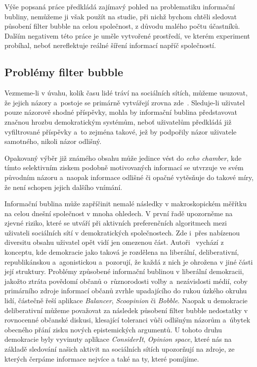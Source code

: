 \documentclass[12pt, a4paper]{article}
\numberwithin{equation}{section} 	%
\begin{document}
Výše popsaná práce předkládá zajímavý pohled na problematiku informační bubliny, nemůžeme ji však použít na studie, při nichž bychom chtěli sledovat působení filter bubble na celou společnost, z důvodu malého počtu účastníků. Dalším negativem této práce je uměle vytvořené prostředí, ve kterém experiment probíhal, neboť nereflektuje reálné šíření informací napříč společností.

\subsection{Problémy filter bubble}
Vezmeme-li v úvahu, kolik času lidé tráví na sociálních sítích, můžeme usuzovat, že jejich názory a~postoje se primárně vytvářejí zrovna zde~\cite{TheImpactOfFilterBubble, BeyondFilterBubble, whyNewsOnTwitter}. Sleduje-li uživatel pouze názorově shodné příspěvky, mohla by informační bublina před\-sta\-vo\-vat značnou hrozbu demokratickým systémům, neboť uživatelům předkládá již vyfiltrované příspěvky a~to zejména takové, jež by podpořily názor uživatele samotného, nikoli názor odlišný.

Opakovaný výběr již známého obsahu může jedince vést do \textit{echo chamber}, kde tímto selektivním ziskem podobně motivovaných informací se utvrzuje ve svém původním názoru a~naopak informace odlišné či opačné vytěsňuje do takové míry, že není schopen jejich dalšího vnímání.

Informační bublina může zapříčinit nemalé následky v makroskopickém mě\-ří\-tku na celou dnešní společnost v mnoha ohledech. V první řadě upozorněme na zjevné riziko, které se utváří při aktivních preferenčních algoritmech mezi uživateli sociálních sítí v demokratických společnostech. Zde i~přes nabízenou diversitu obsahu uživatel opět vidí jen omezenou část. Autoři~\cite{BreakingTheFilterBubble} vychází z konceptu, kde demokracie jako taková je rozdělena na liberální, deliberativní, republikánskou a~agonistickou a~pozorují, že každá z nich je ohrožena v jiné části její struktury. Problémy způsobené informační bublinou v liberální demokracii, jakožto ztráta povědomí občanů o~různorodosti volby a~nezávislosti médií, coby primárního zdroje informací občanů zvrhle upadajícího do rukou úzkého okruhu lidí, částečně řeší aplikace \textit{Balancer}, \textit{Scoopinion} či \textit{Bobble}.
Naopak u demokracie deliberativní můžeme považovat za následek působení filter bubble nedostatky v rovnocenné občanské diskusi, klesající toleranci vůči odlišným názorům a~úbytek obecného přání zisku nových epistemických argumentů. U tohoto druhu demokracie byly vyvinuty aplikace \textit{ConsiderIt}, \textit{Opinion space}, které nás na základě sledování našich aktivit na sociálních sítích upozorňují na zdroje, ze kterých čerpáme informace nejvíce a také na ty, které pomíjíme.
\end{document}
